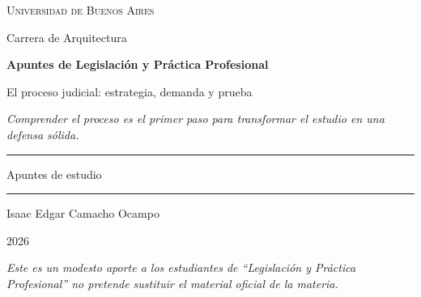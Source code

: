 \documentclass[12pt,oneside]{book}
\newcommand{\universidad}{Universidad de Buenos Aires}
\newcommand{\carrera}{Carrera de Arquitectura}
\newcommand{\materia}{Legislación y Práctica Profesional}
\newcommand{\titulo}{El proceso judicial: estrategia, demanda y prueba}
\newcommand{\autor}{Isaac Edgar Camacho Ocampo}
\newcommand{\anio}{2026}
\begin{document}
\begin{titlepage}

\thispagestyle{empty}

\begin{center}

\vspace*{1cm}

{\large \textsc{\universidad}}

\vspace{0.2cm}

{\large \carrera}

\vspace{3cm}

{\Huge \textbf{Apuntes de \materia}}

\vspace{1cm}

{\LARGE \titulo}

\vspace{0.8cm}

\textit{Comprender el proceso es el primer paso para transformar el estudio en una defensa sólida.}

\vspace{1.2cm}

\rule{0.70\textwidth}{0.5pt}

\vspace{0.5cm}

{\large Apuntes de estudio}

\vspace{0.5cm}

\rule{0.70\textwidth}{0.5pt}

\vfill

{\large \autor}

\vspace{0.3cm}

{\large \anio}

\end{center}

\vfill

\begin{flushleft}
\textit{Este es un modesto aporte a los estudiantes de ``Legislación y Práctica Profesional'' no pretende sustituir el material oficial de la materia.}
\end{flushleft}

\end{titlepage}
\end{document}

